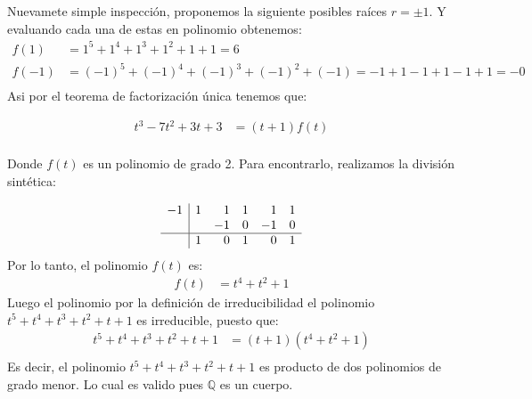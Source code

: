 \begin{solution}
    Nuevamete simple inspección, proponemos la siguiente posibles raíces $r=\pm 1$. Y evaluando cada una de estas en polinomio obtenemos:
    \begin{align*}
    f(1) &= 1^5 + 1^4 + 1^3 + 1^2 + 1 + 1 = 6 \\
    f(-1) &= (-1)^5 + (-1)^4 + (-1)^3 + (-1)^2 + (-1) = -1 + 1 - 1 + 1 - 1 + 1 = -0 \\
    \end{align*}
    Asi por el teorema de factorización única tenemos que:

    \begin{align*}
        t^3 - 7t^2 + 3t + 3 &= (t+1)f(t) \\
    \end{align*}

    Donde $f(t)$ es un polinomio de grado 2. Para encontrarlo, realizamos la división sintética:

    \begin{align*}
        \begin{array}{r|rrrrr}
            -1 & 1 & 1 & 1 & 1 & 1 \\
              &   & -1 & 0 & -1 & 0 \\
            \hline
              & 1 & 0 & 1 & 0 & 1
        \end{array}
    \end{align*}
    Por lo tanto, el polinomio $f(t)$ es:
    \begin{align*}
        f(t) &= t^4 + t^2 + 1
    \end{align*}
    Luego el polinomio por la definición de irreducibilidad el polinomio $t^5 + t^4 + t^3 + t^2 + t + 1$ es irreducible, puesto que:
    \begin{align*}
        t^5 + t^4 + t^3 + t^2 + t + 1 &= (t+1)(t^4 + t^2 + 1) \\
    \end{align*}
    Es decir, el polinomio $t^5 + t^4 + t^3 + t^2 + t + 1$ es producto de dos polinomios de grado menor. Lo cual es valido pues $\mathbb Q$ es un cuerpo.
\end{solution}